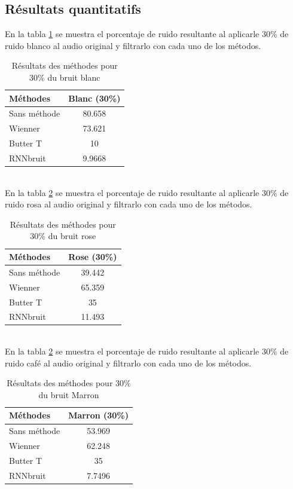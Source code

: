 \documentclass[conference,onecolumn]{IEEEtran}
\begin{document}
\subsection{Résultats quantitatifs}
En la tabla \ref{table:t1} se muestra el porcentaje de ruido
resultante al aplicarle 30\% de ruido blanco al audio original y
filtrarlo con cada uno de los métodos.  
\begin{table}[hbt!]
    \centering
    \begin{tabular}{ l  c }
    \textbf{Méthodes} & \textbf{Blanc (30\%)} \\
    \hline
    Sans méthode & 80.658 \\
    Wienner & 73.621 \\
    Butter T & 10 \\
    RNNbruit & 9.9668 \\
    \end{tabular}
    \caption{Résultats des méthodes pour 30\% du bruit blanc}
    \label{table:t1}
\end{table}
\hfill \\
En la tabla \ref{table:t2} se muestra el porcentaje de ruido resultante al aplicarle 30\% de ruido rosa al audio original y filtrarlo con cada uno de los métodos.  
\begin{table}[hbt!]
    \centering
    \begin{tabular}{ l  c }
    \textbf{Méthodes} & \textbf{Rose (30\%)} \\
    \hline
    Sans méthode & 39.442 \\
    Wienner & 65.359 \\
    Butter T & 35 \\
    RNNbruit & 11.493 \\
    \end{tabular}
    \caption{Résultats des méthodes pour 30\% du bruit rose}
    \label{table:t2}
\end{table}
\hfill \\
En la tabla \ref{table:t2} se muestra el porcentaje de ruido resultante al aplicarle 30\% de ruido café al audio original y filtrarlo con cada uno de los métodos. 
\begin{table}[hbt!]
    \centering
    \begin{tabular}{ l  c }
    \textbf{Méthodes} & \textbf{Marron (30\%)} \\
    \hline
    Sans méthode & 53.969 \\
    Wienner & 62.248 \\
    Butter T & 35 \\
    RNNbruit & 7.7496 \\
    \end{tabular}
    \caption{Résultats des méthodes pour 30\% du bruit Marron}
    \label{table:t3}
\end{table}
\end{document}
